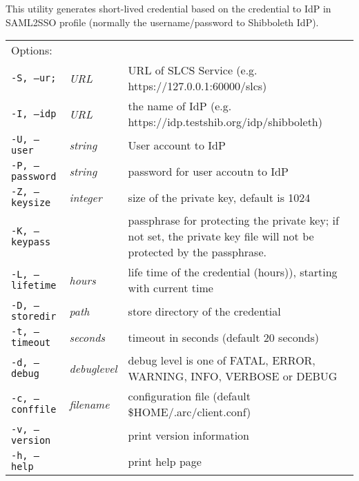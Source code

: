 This utility generates  short-lived
credential  based  on the credential to IdP in SAML2SSO profile (normally the
username/password to Shibboleth IdP).

\hspace*{0.5cm}
\begin{shaded}
\end{shaded}
\begin{longtable}{llp{8cm}}
   Options:&&\\
   \texttt{-S, --ur;}& \textit{URL} & URL of SLCS Service (e.g. https://127.0.0.1:60000/slcs)\\
   \texttt{-I, --idp}& \textit{URL} & the name of IdP (e.g. https://idp.testshib.org/idp/shibboleth)\\
   \texttt{-U, --user}& \textit{string} & User account to IdP\\
   \texttt{-P, --password}& \textit{string} & password for user accoutn to IdP\\
   \texttt{-Z, --keysize}& \textit{integer} & size of the private key, default is 1024\\
   \texttt{-K, --keypass}& \textit{} & passphrase for protecting the private key; if not set, the private key file will not be protected by the passphrase.\\
   \texttt{-L, --lifetime}& \textit{hours} & life time of the credential (hours)), starting with current time\\
   \texttt{-D, --storedir}& \textit{path} & store directory of the credential\\
   \texttt{-t, --timeout}& \textit{seconds} & timeout in seconds (default 20 seconds)\\
   \texttt{-d, --debug}& \textit{debuglevel}&debug level is one of  FATAL, ERROR, WARNING, INFO, VERBOSE or DEBUG\\
   \texttt{-c, --conffile}&\textit{filename}& configuration file (default {\$}HOME/.arc/client.conf)\\
   \texttt{-v, --version}& & print version information\\
   \texttt{-h, --help}& & print help page\\
\end{longtable}

